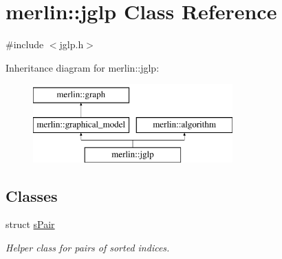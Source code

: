 \hypertarget{classmerlin_1_1jglp}{}\section{merlin\+:\+:jglp Class Reference}
\label{classmerlin_1_1jglp}


{\ttfamily \#include $<$jglp.\+h$>$}

Inheritance diagram for merlin\+:\+:jglp\+:\begin{figure}[H]
\begin{center}
\leavevmode
\includegraphics[height=3.000000cm]{classmerlin_1_1jglp}
\end{center}
\end{figure}
\subsection*{Classes}
\begin{DoxyCompactItemize}
\item 
struct \hyperlink{structmerlin_1_1jglp_1_1sPair}{s\+Pair}
\begin{DoxyCompactList}\small\item\em Helper class for pairs of sorted indices. \end{DoxyCompactList}\end{DoxyCompactItemize}
